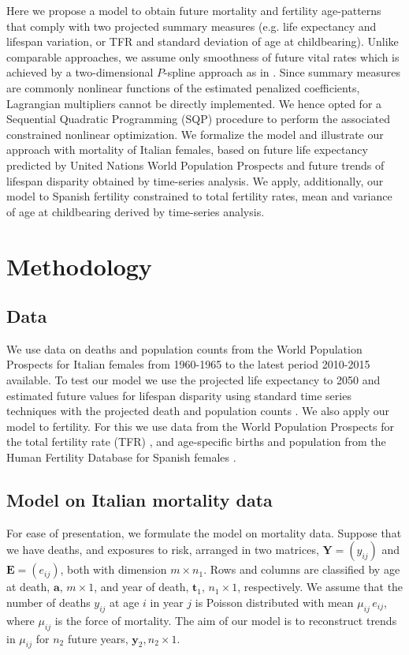 \documentclass[a4paper,twoside, openright, 12pt, leqno]{article}
\begin{document}
Here we propose a model to obtain future mortality and fertility age-patterns that comply with two projected summary measures (e.g. life expectancy and lifespan variation, or TFR and standard deviation of age at childbearing). Unlike comparable approaches, we assume only smoothness of future vital rates which is achieved by a two-dimensional $P$-spline approach as in \citet{currie2004smoothing}. Since summary measures are commonly nonlinear functions of the estimated penalized coefficients, Lagrangian multipliers cannot be directly implemented. We hence opted for a Sequential Quadratic Programming (SQP) procedure \citep{nocedal2006sequential} to perform the associated constrained nonlinear optimization. We formalize the model and illustrate our approach with mortality of Italian females, based on future life expectancy predicted by United Nations World Population Prospects \citep{UN2017} and future trends of lifespan disparity obtained by time-series analysis. We apply, additionally, our model to Spanish fertility constrained to total fertility rates, mean and variance of age at childbearing derived by time-series analysis.

\section{Methodology}

\subsection{Data}
We use data on deaths and population counts from the World Population Prospects for Italian females from 1960-1965 to the latest period 2010-2015 available. To test our model we use the projected life expectancy to 2050 and estimated future values for lifespan disparity using standard time series techniques with the projected death and population counts \citep{UN2017}. We also apply our model to fertility. For this we use data from the World Population Prospects for the total fertility rate (TFR) \citep{UN2017}, and age-specific births and population from the Human Fertility Database for Spanish females \cite{HFD}.

\subsection{Model on Italian mortality data}


For ease of presentation, we formulate the model on mortality data. Suppose that we have deaths, and exposures to risk, arranged in two matrices, 
$\bm{Y} = (y_{ij})$ and $\bm{E} = (e_{ij})$, both with dimension $m \times n_{1}$.  Rows and columns are classified by age at death, $\bm{a}, \,m \times 1$, and year of death, $\bm{t}_{1}, \,n_{1} \times 1$, respectively.  
We assume that the number of deaths $y_{ij}$ at age $i$ in year $j$ is Poisson distributed with mean $\mu_{ij} \,e_{ij}$, where $\mu_{ij}$ is the force of mortality. 
The aim of our model is to reconstruct trends in $\mu_{ij}$ for  $n_{2}$ future years, $\bm{y}_{2}, n_{2} \times 1$.
\end{document}
